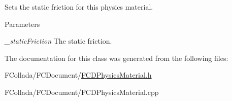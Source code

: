 \label{classFCDPhysicsMaterial_ad89f828ca130c56e54f00f97384d492a}
Sets the static friction for this physics material. 
\begin{DoxyParams}{Parameters}
\item[{\em \_\-staticFriction}]The static friction. \end{DoxyParams}


The documentation for this class was generated from the following files:\begin{DoxyCompactItemize}
\item 
FCollada/FCDocument/\hyperlink{FCDPhysicsMaterial_8h}{FCDPhysicsMaterial.h}\item 
FCollada/FCDocument/FCDPhysicsMaterial.cpp\end{DoxyCompactItemize}

